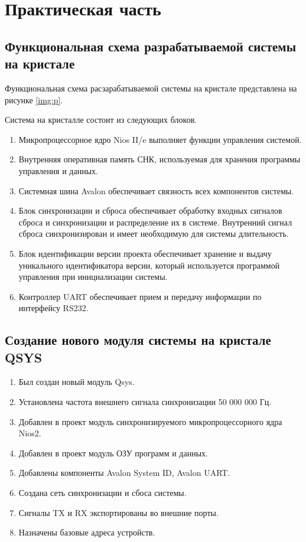 \chapter*{Практическая часть}

\section*{Функциональная схема разрабатываемой системы на кристале}

Функциональная схема расзарабатываемой системы на кристале представлена на рисунке \ref{img:p}.


Система на кристалле состоит из следующих блоков.

\begin{enumerate}
	\item Микропроцессорное ядро Nios II/e выполняет функции управления
	системой.

	\item Внутренняя оперативная память СНК, используемая для хранения программы
	управления и данных. 
	\item Системная шина Avalon обеспечивает связность всех компонентов системы.
	\item Блок синхронизации и сброса обеспечивает обработку входных сигналов сброса и
	синхронизации и распределение их в системе. Внутренний сигнал сброса
	синхронизирован и имеет необходимую для системы длительность.
	\item Блок идентификации версии проекта обеспечивает хранение и выдачу уникального идентификатора версии, который используется программой управления при инициализации системы.
	\item Контроллер UART обеспечивает прием и передачу информации по
	интерфейсу RS232.
\end{enumerate}
\clearpage

\section*{Создание нового модуля системы на кристале QSYS}


\begin{enumerate}
	\item Был создан новый модуль Qsys.	
	\item Установлена частота внешнего сигнала синхронизации 50 000 000 Гц.
	\item Добавлен в проект модуль синхронизируемого микропроцессорного ядра Nios2.
	\item Добавлен в проект модуль ОЗУ программ и данных.
	\item Добавлены компоненты Avalon System ID, Avalon UART.
	\item Создана сеть синхронизации и сбоса системы.
	\item Сигналы TX и RX экспортированы во внешние порты.
    
	\item Назначены базовые адреса устройств.
\end{enumerate}

